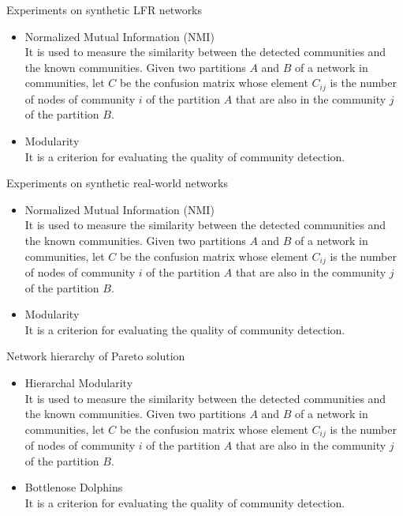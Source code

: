 \documentclass[aspectratio=169,xcolor=dvipsnames]{beamer}
\begin{document}

\begin{frame}{Experiments on synthetic LFR networks}
    \begin{itemize}
        \item Normalized Mutual Information (NMI) \\
        It is used to measure the similarity between the detected communities and the known communities. Given two partitions $A$ and $B$ of a network in communities, let $C$ be the confusion matrix whose element $C_{ij}$ is the number of nodes of community $i$ of the partition $A$ that are also in the community $j$ of the partition $B$.
        \item Modularity \\
        It is a criterion for evaluating the quality of community detection.
    \end{itemize}
\end{frame}


\begin{frame}{Experiments on synthetic real-world networks}
    \begin{itemize}
        \item Normalized Mutual Information (NMI) \\
        It is used to measure the similarity between the detected communities and the known communities. Given two partitions $A$ and $B$ of a network in communities, let $C$ be the confusion matrix whose element $C_{ij}$ is the number of nodes of community $i$ of the partition $A$ that are also in the community $j$ of the partition $B$.
        \item Modularity \\
        It is a criterion for evaluating the quality of community detection.
    \end{itemize}
\end{frame}


\begin{frame}{Network hierarchy of Pareto solution}
    \begin{itemize}
        \item Hierarchal Modularity \\
        It is used to measure the similarity between the detected communities and the known communities. Given two partitions $A$ and $B$ of a network in communities, let $C$ be the confusion matrix whose element $C_{ij}$ is the number of nodes of community $i$ of the partition $A$ that are also in the community $j$ of the partition $B$.
        \item Bottlenose Dolphins \\
        It is a criterion for evaluating the quality of community detection.
    \end{itemize}
\end{frame}
\end{document}
